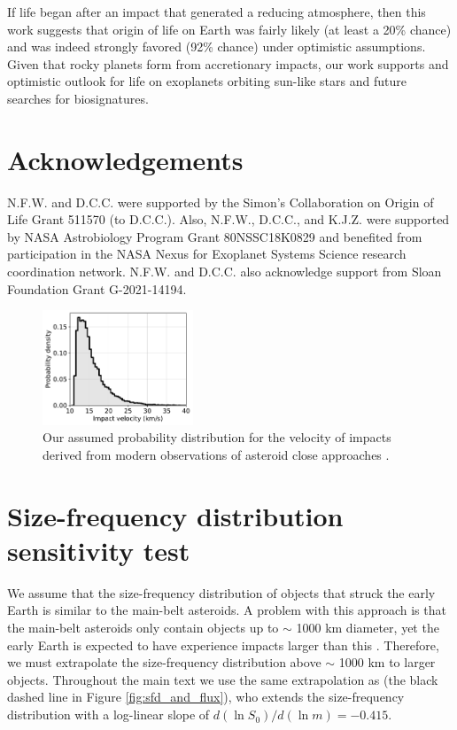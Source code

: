 \documentclass[manuscript]{aastex63}
\begin{document}
If life began after an impact that generated a reducing atmosphere, then this work suggests that origin of life on Earth was fairly likely (at least a 20\% chance) and was indeed strongly favored (92\% chance) under optimistic assumptions. Given that rocky planets form from accretionary impacts, our work supports and optimistic outlook for life on exoplanets orbiting sun-like stars and future searches for biosignatures. 

\section*{Acknowledgements}

N.F.W. and D.C.C. were supported by the Simon's Collaboration on Origin of Life Grant 511570 (to D.C.C.). Also, N.F.W., D.C.C., and K.J.Z. were supported by NASA Astrobiology Program Grant 80NSSC18K0829 and benefited from participation in the NASA Nexus for Exoplanet Systems Science research coordination network. N.F.W. and D.C.C. also acknowledge support from Sloan Foundation Grant G-2021-14194.

\appendix

\renewcommand{\thefigure}{A\arabic{figure}}
\renewcommand{\thetable}{A\arabic{table}}
\setcounter{figure}{0}
\setcounter{table}{0}

\begin{figure}
  \centering
  \includegraphics[width=0.4\textwidth]{figures/velocity_distribution.pdf}
  \caption{Our assumed probability distribution for the velocity of impacts derived from modern observations of asteroid close approaches \citep{Park_2023}.}
  \label{fig:velocity_distribution}
\end{figure}

\section{Size-frequency distribution sensitivity test} \label{sec:append_sfd}

We assume that the size-frequency distribution of objects that struck the early Earth is similar to the main-belt asteroids. A problem with this approach is that the main-belt asteroids only contain objects up to $\sim$ 1000 km diameter, yet the early Earth is expected to have experience impacts larger than this \citep{Marchi_2014}. Therefore, we must extrapolate the size-frequency distribution above $\sim$ 1000 km to larger objects. Throughout the main text we use the same extrapolation as \citet{Marchi_2014} (the black dashed line in Figure \ref{fig:sfd_and_flux}), who extends the size-frequency distribution with a log-linear slope of $d (\ln S_0)/d (\ln m) = - 0.415$.
\end{document}
